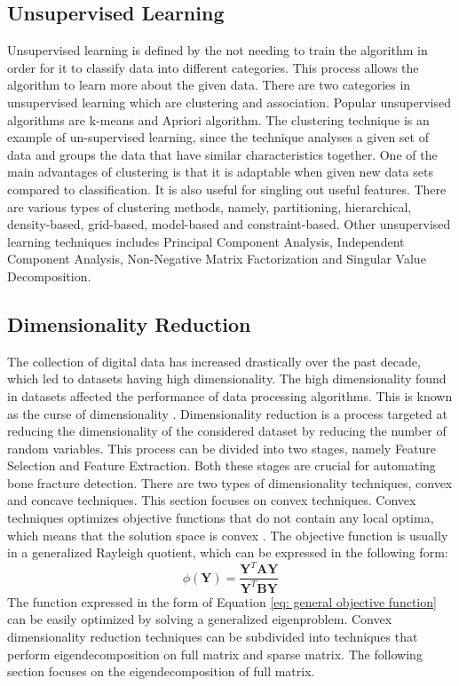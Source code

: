 \documentclass[11pt,twocolumn]{witseiepaper}
\begin{document}
	\subsection{\textbf{Unsupervised Learning}}
	Unsupervised learning is defined by the not needing to train the algorithm in order for it to classify data into different categories. This process allows the algorithm to learn more about the given data. There are two categories in unsupervised learning which are clustering and association. Popular unsupervised algorithms are k-means and Apriori algorithm. The clustering technique is an example of un-supervised learning, since the technique analyses a given set of data and groups the data that have similar characteristics together. One of the main advantages of clustering is that it is adaptable when given new data sets compared to classification. It is also useful for singling out useful features. There are various types of clustering methods, namely, partitioning, hierarchical, density-based, grid-based, model-based and constraint-based. Other unsupervised learning techniques includes Principal Component Analysis, Independent Component Analysis, Non-Negative Matrix Factorization and Singular Value Decomposition. 
	
	\subsection{\textbf{Dimensionality Reduction}}
	The collection of digital data has increased drastically over the past decade, which led to datasets having high dimensionality. The high dimensionality found in datasets affected the performance of data processing algorithms. This is known as the curse of dimensionality \cite{Center2002}. Dimensionality reduction is a process targeted at reducing the dimensionality of the considered dataset by reducing the number of random variables. This process can be divided into two stages, namely Feature Selection and Feature Extraction. Both these stages are crucial for automating bone fracture detection. There are two types of dimensionality techniques, convex and concave techniques. This section focuses on convex techniques. Convex techniques optimizes objective functions that do not contain any local optima, which means that the solution space is convex \cite{Boyd2010}. The objective function is usually in a generalized Rayleigh quotient, which can be expressed in the following form: 
	\begin{equation}
	\phi(\textbf{Y}) = \frac{\textbf{Y}^{T}\textbf{AY}}{\textbf{Y}^{T}\textbf{BY}}
	\label{eq: general objective function}
	\end{equation}
	The function expressed in the form of Equation \ref{eq: general objective function} can be easily optimized by solving a generalized eigenproblem. Convex dimensionality reduction techniques can be subdivided into techniques that perform eigendecomposition on full matrix and sparse matrix. The following section focuses on the eigendecomposition of full matrix. 
	
\end{document}
